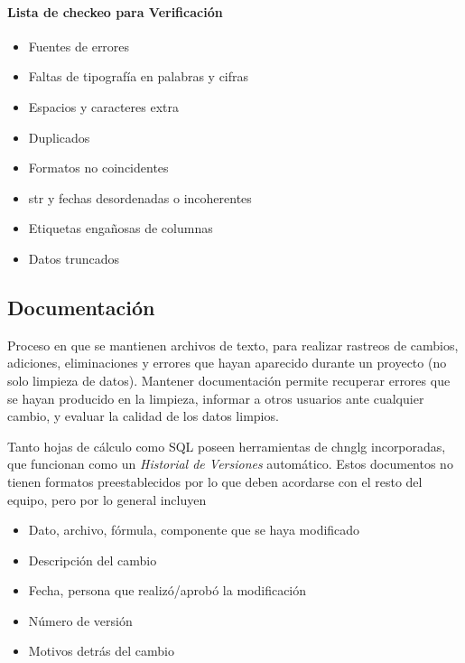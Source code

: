 \paragraph{Lista de checkeo para Verificación}
\begin{itemize}
    \item {Fuentes de errores}
    \item {Faltas de tipografía en palabras y cifras}
    \item {Espacios y caracteres extra}
    \item {Duplicados}
    \item {Formatos no coincidentes}
    \item {\gls{str} y fechas desordenadas o incoherentes}
    \item {Etiquetas engañosas de columnas}
    \item {Datos truncados}
\end{itemize}

\subsection{Documentación}
Proceso en que se mantienen archivos de texto, para realizar rastreos de cambios, adiciones, eliminaciones y errores que hayan aparecido durante un proyecto (no solo limpieza de datos). Mantener documentación permite recuperar errores que se hayan producido en la limpieza, informar a otros usuarios ante cualquier cambio, y evaluar la calidad de los datos limpios. 

Tanto hojas de cálculo como SQL poseen herramientas de \gls{chnglg} incorporadas, que funcionan como un \textit{Historial de Versiones} automático. Estos documentos no tienen formatos preestablecidos por lo que deben acordarse con el resto del equipo, pero por lo general incluyen
\begin{itemize}
    \item {Dato, archivo, fórmula, componente que se haya modificado}
    \item {Descripción del cambio}
    \item {Fecha, persona que realizó/aprobó la modificación}
    \item {Número de versión}
    \item {Motivos detrás del cambio}
\end{itemize}

\newpage